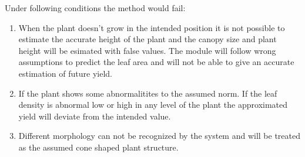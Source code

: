 Under following conditions the method would fail:

\begin{enumerate}
    \item When the plant doesn't grow in the intended position it is not possible to estimate the accurate height of the plant and the canopy size and plant height will be esimated with false values. The module will follow wrong assumptions to predict the leaf area and will not be able to give an accurate estimation of future yield.

    \item If the plant shows some abnormalitites to the assumed norm. If the leaf density is abnormal low or high in any level of the plant the approximated yield will deviate from the intended value.

    \item Different morphology can not be recognized by the system and will be treated as the assumed cone shaped plant structure.
\end{enumerate}
